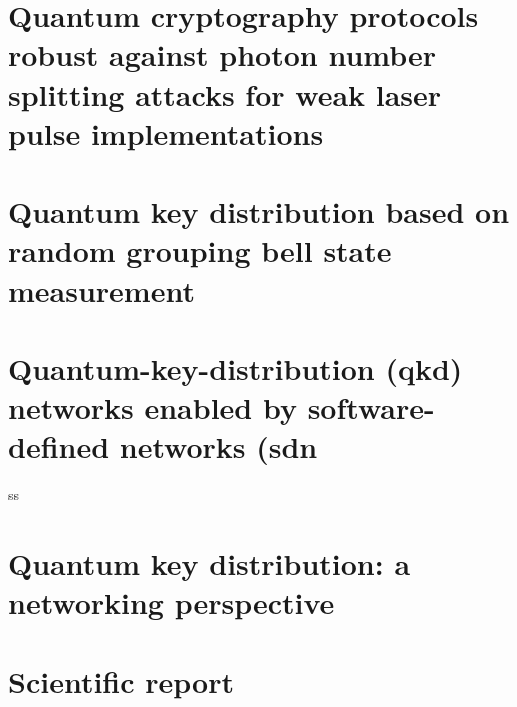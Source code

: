 \section{Quantum cryptography protocols robust against photon number splitting attacks for weak laser pulse implementations}


\section{Quantum key distribution based on random grouping bell state measurement}



\section{Quantum-key-distribution (qkd) networks enabled by software-defined networks (sdn}
ss

\section{Quantum key distribution: a networking perspective}


\clearpage
\section{Scientific report}



